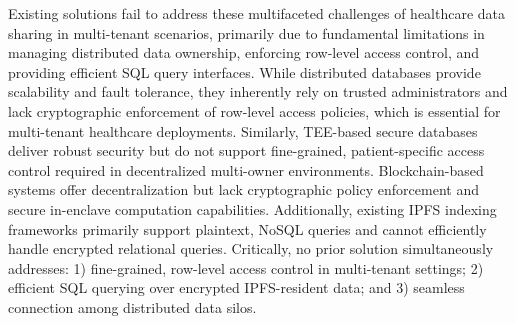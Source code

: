 \documentclass[conference]{IEEEtran}
\begin{document}
Existing solutions fail to address these multifaceted challenges of healthcare data sharing in multi-tenant scenarios, primarily due to fundamental limitations in managing distributed data ownership, enforcing row-level access control, and providing efficient SQL query interfaces. While distributed databases \cite{taft2020cockroachdb,apachecassandra2025, bacon2017spanner} provide scalability and fault tolerance, they inherently rely on trusted administrators and lack cryptographic enforcement of row-level access policies, which is essential for multi-tenant healthcare deployments. Similarly, TEE-based secure databases \cite{yang2024secudb, wang2022operon, chen2020qshield, priebe2018enclavedb} deliver robust security but do not support fine-grained, patient-specific access control required in decentralized multi-owner environments. Blockchain-based systems \cite{mukherjee2025web3db, haddad2024e2ee, lucking2020decentralized} offer decentralization but lack cryptographic policy enforcement and secure in-enclave computation capabilities. Additionally, existing IPFS indexing frameworks \cite{li2024ipfs, arer2022efficient, rathee2019blockchain} primarily support plaintext, NoSQL queries and cannot efficiently handle encrypted relational queries. Critically, no prior solution simultaneously addresses: 1) fine-grained, row-level access control in multi-tenant settings; 2) efficient SQL querying over encrypted IPFS-resident data; and 3) seamless connection among distributed data silos.
\end{document}
